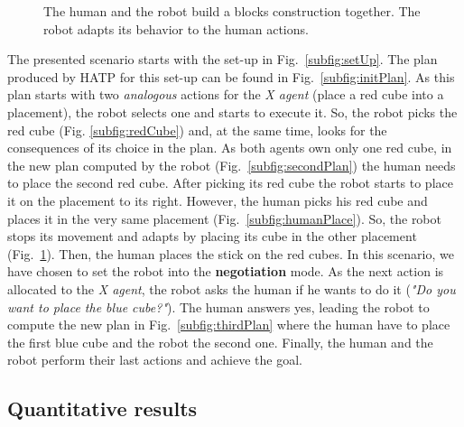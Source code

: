 \documentclass[english,a4paper,11pt,twoside]{StyleThese}
\begin{document}
\begin{figure}[!h]
{       \label{subfig:robotAdapts}
   }
    \caption{The human and the robot build a blocks construction together. The robot adapts its behavior to the human actions.}
\end{figure}


The presented scenario starts with the set-up in Fig.~\ref{subfig:setUp}. The plan produced by HATP for this set-up can be found in Fig.~\ref{subfig:initPlan}. As this plan starts with two \textit{analogous} actions for the \textit{X agent} (place a red cube into a placement), the robot selects one and starts to execute it. So, the robot picks the red cube (Fig. \ref{subfig:redCube}) and, at the same time, looks for the consequences of its choice in the plan. As both agents own only one red cube, in the new plan computed by the robot (Fig.~\ref{subfig:secondPlan}) the human needs to place the second red cube. After picking its red cube the robot starts to place it on the placement to its right. However, the human picks his red cube and places it in the very same placement (Fig.~\ref{subfig:humanPlace}). So, the robot stops its movement and adapts by placing its cube in the other placement (Fig.~\ref{subfig:robotAdapts}). Then, the human places the stick on the red cubes. In this scenario, we have chosen to set the robot into the \textbf{negotiation} mode. As the next action is allocated to the \textit{X agent}, the robot asks the human if he wants to do it (\textit{"Do you want to place the blue cube?"}). The human answers yes, leading the robot to compute the new plan in Fig.~\ref{subfig:thirdPlan} where the human have to place the first blue cube and the robot the second one. Finally, the human and the robot perform their last actions and achieve the goal.


\subsection{Quantitative results}
\end{document}
